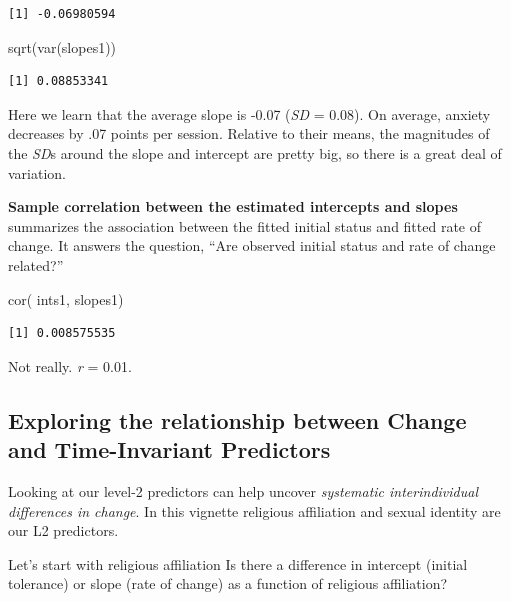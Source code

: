 \documentclass[
  english,
]{book}
\newenvironment{Shaded}{\begin{snugshade}}{\end{snugshade}}
\newcommand{\FunctionTok}[1]{\textcolor[rgb]{0.00,0.00,0.00}{#1}}
\newcommand{\NormalTok}[1]{#1}
\begin{document}
\begin{verbatim}
[1] -0.06980594
\end{verbatim}

\begin{Shaded}
\begin{Highlighting}[]
\FunctionTok{sqrt}\NormalTok{(}\FunctionTok{var}\NormalTok{(slopes1))}
\end{Highlighting}
\end{Shaded}

\begin{verbatim}
[1] 0.08853341
\end{verbatim}

Here we learn that the average slope is -0.07 (\emph{SD} = 0.08). On average, anxiety decreases by .07 points per session. Relative to their means, the magnitudes of the \emph{SD}s around the slope and intercept are pretty big, so there is a great deal of variation.

\textbf{Sample correlation between the estimated intercepts and slopes} summarizes the association between the fitted initial status and fitted rate of change. It answers the question, ``Are observed initial status and rate of change related?''

\begin{Shaded}
\begin{Highlighting}[]
\FunctionTok{cor}\NormalTok{( ints1, slopes1)}
\end{Highlighting}
\end{Shaded}

\begin{verbatim}
[1] 0.008575535
\end{verbatim}

Not really. \emph{r} = 0.01.

\hypertarget{exploring-the-relationship-between-change-and-time-invariant-predictors}{%
\subsection{Exploring the relationship between Change and Time-Invariant Predictors}\label{exploring-the-relationship-between-change-and-time-invariant-predictors}}

Looking at our level-2 predictors can help uncover \emph{systematic interindividual differences in change}. In this vignette religious affiliation and sexual identity are our L2 predictors.

Let's start with religious affiliation Is there a difference in intercept (initial tolerance) or slope (rate of change) as a function of religious affiliation?
\end{document}
